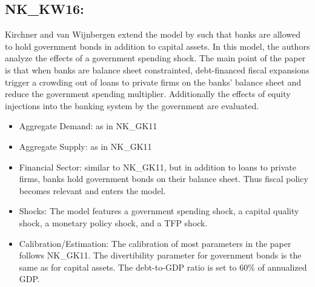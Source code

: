 \documentclass[11pt,a4paper]{article}
\begin{document}
	\subsection{NK\_KW16: \texorpdfstring{\cite{kirchner2016fiscal}}{Kirchner and van Wijnbergen (2016)}}
	\label{NKKW16}
	Kirchner and van Wijnbergen extend the model by \cite{GertlerKaradi2011} such that banks are allowed to hold government bonds in addition to capital assets. In this model, the authors analyze the effects of a government spending shock. The main point of the paper is that when banks are balance sheet constrainted, debt-financed fiscal expansions trigger a crowding out of loans to private firms on the banks' balance sheet and reduce the government spending multiplier. Additionally the effects of equity injections into the banking system by the government are evaluated. 
	\begin{itemize}
		\item Aggregate Demand: as in NK\_GK11
		\item Aggregate Supply: as in NK\_GK11
		\item Financial Sector: similar to NK\_GK11, but in addition to loans to private firms, banks hold government bonds on their balance sheet. Thus fiscal policy becomes relevant and enters the model. 
		\item Shocks: The model features a government spending shock, a capital quality shock, a monetary policy shock, and a TFP shock.
		\item Calibration/Estimation: The calibration of most parameters in the paper follows NK\_GK11. The divertibility parameter for government bonds is the same as for capital assets. The debt-to-GDP ratio is set to 60\% of annualized GDP. 
		
	\end{itemize}
	
	
\end{document}
